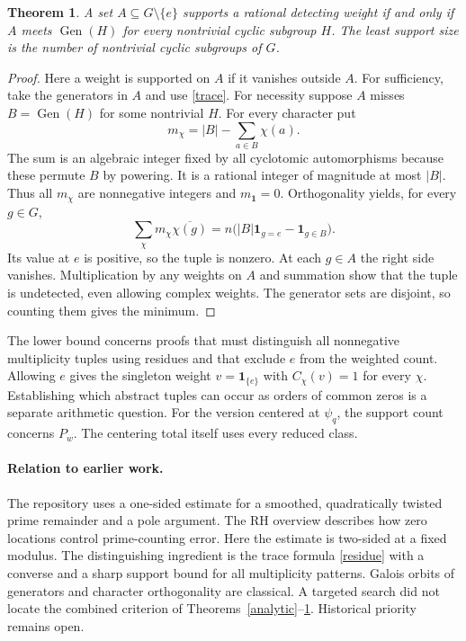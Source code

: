 \documentclass[11pt]{article}
\newtheorem{thm}{Theorem}
\newcommand{\gen}{\operatorname{Gen}}
\newcommand{\one}{\mathbf{1}}
\newcommand{\pn}{\psi_q}
\begin{document}
\begin{thm}\label{support}
A set $A\subseteq G\setminus\{e\}$ supports a rational detecting weight if and only if $A$ meets $\gen(H)$ for every nontrivial cyclic subgroup $H$. The least support size is the number of nontrivial cyclic subgroups of $G$.
\end{thm}
\begin{proof}
Here a weight is supported on $A$ if it vanishes outside $A$. For sufficiency, take the generators in $A$ and use \eqref{trace}. For necessity suppose $A$ misses $B=\gen(H)$ for some nontrivial $H$. For every character put
\[
 m_\chi=|B|-\sum_{a\in B}\chi(a).
\]
The sum is an algebraic integer fixed by all cyclotomic automorphisms because these permute $B$ by powering. It is a rational integer of magnitude at most $|B|$. Thus all $m_\chi$ are nonnegative integers and $m_{\one}=0$. Orthogonality yields, for every $g\in G$,
\[
 \sum_\chi m_\chi\overline{\chi(g)}
 = n\bigl(|B|\one_{g=e}-\one_{g\in B}\bigr).
\]
Its value at $e$ is positive, so the tuple is nonzero. At each $g\in A$ the right side vanishes. Multiplication by any weights on $A$ and summation show that the tuple is undetected, even allowing complex weights. The generator sets are disjoint, so counting them gives the minimum.
\end{proof}
The lower bound concerns proofs that must distinguish all nonnegative multiplicity tuples using residues and that exclude $e$ from the weighted count. Allowing $e$ gives the singleton weight $v=\one_{\{e\}}$ with $C_\chi(v)=1$ for every $\chi$. Establishing which abstract tuples can occur as orders of common zeros is a separate arithmetic question. For the version centered at $\pn$, the support count concerns $P_w$. The centering total itself uses every reduced class.

\paragraph{Relation to earlier work.}
The repository \cite{lean} uses a one-sided estimate for a smoothed, quadratically twisted prime remainder and a pole argument. The RH overview \cite{wiki} describes how zero locations control prime-counting error. Here the estimate is two-sided at a fixed modulus. The distinguishing ingredient is the trace formula \eqref{residue} with a converse and a sharp support bound for all multiplicity patterns. Galois orbits of generators and character orthogonality are classical. A targeted search did not locate the combined criterion of Theorems~\ref{analytic}--\ref{support}. Historical priority remains open.
\end{document}
